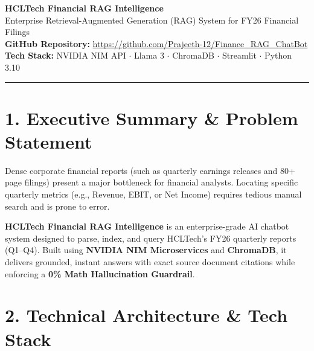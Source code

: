 \documentclass[11pt,a4paper]{article}
\begin{document}
\begin{center}
    {\Huge \bfseries \color{primary} HCLTech Financial RAG Intelligence}\\[0.4em]
    {\large Enterprise Retrieval-Augmented Generation (RAG) System for FY26 Financial Filings}\\[0.6em]
    \small \textbf{GitHub Repository:} \href{https://github.com/Prajeeth-12/Finance_RAG_ChatBot}{https://github.com/Prajeeth-12/Finance\_RAG\_ChatBot}\\[0.2em]
    \small \textbf{Tech Stack:} NVIDIA NIM API $\cdot$ Llama 3 $\cdot$ ChromaDB $\cdot$ Streamlit $\cdot$ Python 3.10
\end{center}

\vspace{0.5em}
\hrule
\vspace{1em}

\section{1. Executive Summary \& Problem Statement}
Dense corporate financial reports (such as quarterly earnings releases and 80+ page filings) present a major bottleneck for financial analysts. Locating specific quarterly metrics (e.g., Revenue, EBIT, or Net Income) requires tedious manual search and is prone to error.

\textbf{HCLTech Financial RAG Intelligence} is an enterprise-grade AI chatbot system designed to parse, index, and query HCLTech's FY26 quarterly reports (Q1--Q4). Built using \textbf{NVIDIA NIM Microservices} and \textbf{ChromaDB}, it delivers grounded, instant answers with exact source document citations while enforcing a \textbf{0\% Math Hallucination Guardrail}.

\vspace{0.8em}

\section{2. Technical Architecture \& Tech Stack}
\end{document}
